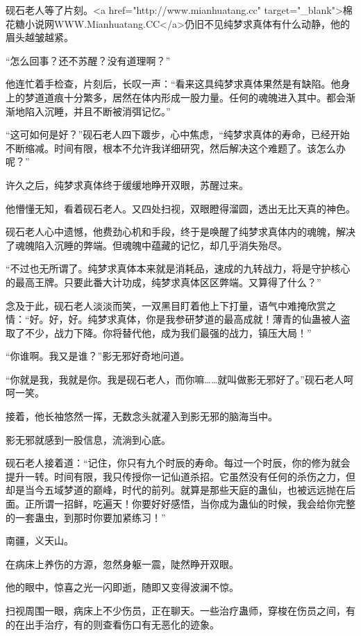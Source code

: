 \begin{this_body}
砚石老人等了片刻。<a href="http://www.mianhuatang.cc" target="\_blank">棉花糖小说网WWW.Mianhuatang.CC</a>仍旧不见纯梦求真体有什么动静，他的眉头越皱越紧。

“怎么回事？还不苏醒？没有道理啊？”

他连忙着手检查，片刻后，长叹一声：“看来这具纯梦求真体果然是有缺陷。他身上的梦道道痕十分繁多，居然在体内形成一股力量。任何的魂魄进入其中。都会渐渐地陷入沉睡，并且不断被消弭记忆。”

“这可如何是好？”砚石老人四下踱步，心中焦虑，“纯梦求真体的寿命，已经开始不断缩减。时间有限，根本不允许我详细研究，然后解决这个难题了。该怎么办呢？”

许久之后，纯梦求真体终于缓缓地睁开双眼，苏醒过来。

他懵懂无知，看着砚石老人。又四处扫视，双眼瞪得溜圆，透出无比天真的神色。

砚石老人心中遗憾，他费劲心机和手段，终于是唤醒了纯梦求真体内的魂魄，解决了魂魄陷入沉睡的弊端。但魂魄中蕴藏的记忆，却几乎消失殆尽。

“不过也无所谓了。纯梦求真体本来就是消耗品，速成的九转战力，将是守护核心的最高王牌。只要此番大计功成，纯梦求真体区区弊端。又算得了什么？”

念及于此，砚石老人淡淡而笑，一双黑目盯着他上下打量，语气中难掩欣赏之情：“好。好，好。纯梦求真体，你是我参研梦道的最高成就！薄青的仙蛊被人盗取了不少，战力下降。你将替代他，成为我们最强的战力，镇压大局！”

“你谁啊。我又是谁？”影无邪好奇地问道。

“你就是我，我就是你。我是砚石老人，而你嘛……就叫做影无邪好了。”砚石老人呵呵一笑。

接着，他长袖悠然一挥，无数念头就灌入到影无邪的脑海当中。

影无邪就感到一股信息，流淌到心底。

砚石老人接着道：“记住，你只有九个时辰的寿命。每过一个时辰，你的修为就会提升一转。时间有限，我只传授你一记仙道杀招。它虽然没有任何的杀伤之力，但却是当今五域梦道的巅峰，时代的前列。就算是那些天庭的蛊仙，也被远远抛在后面。正所谓一招鲜，吃遍天！你要好好感悟，当你成为蛊仙的时候，我会给你完整的一套蛊虫，到那时你要加紧练习！”

南疆，义天山。

在病床上养伤的方源，忽然身躯一震，陡然睁开双眼。

他的眼中，惊喜之光一闪即逝，随即又变得波澜不惊。

扫视周围一眼，病床上不少伤员，正在聊天。一些治疗蛊师，穿梭在伤员之间，有的在出手治疗，有的则查看伤口有无恶化的迹象。


\end{this_body}
